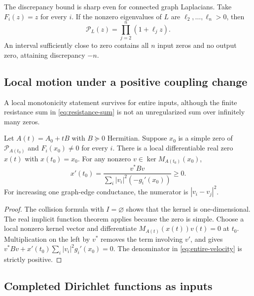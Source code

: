 The discrepancy bound is sharp even for connected graph Laplacians.
Take $F_i(z)=z$ for every $i$.  If the nonzero eigenvalues of $L$ are
$\ell_2,\ldots,\ell_n>0$, then
\[
 \mathcal P_L(z)=\prod_{j=2}^n(1+\ell_jz).
\]
An interval sufficiently close to zero contains all $n$ input zeros
and no output zero, attaining discrepancy $-n$.

\subsection{Local motion under a positive coupling change}

A local monotonicity statement survives for entire inputs, although
the finite resistance sum in \eqref{eq:resistance-sum} is not an
unregularized sum over infinitely many zeros.

\begin{corollary}\label{cor:entire-velocity}
Let $A(t)=A_0+tB$ with $B\succeq0$ Hermitian.
Suppose $x_0$ is a simple zero of $\mathcal P_{A(t_0)}$ and
$F_i(x_0)\neq0$ for every $i$.
There is a local differentiable real zero $x(t)$ with $x(t_0)=x_0$.
For any nonzero $v\in\ker M_{A(t_0)}(x_0)$,
\begin{equation}\label{eq:entire-velocity}
 x'(t_0)=
 \frac{v^*Bv}{\displaystyle\sum_i|v_i|^2(-g_i'(x_0))}\geq0.
\end{equation}
For increasing one graph-edge conductance, the numerator is
$|v_i-v_j|^2$.
\end{corollary}
\begin{proof}
The collision formula with $I=\varnothing$ shows that the kernel is
one-dimensional.  The real implicit function theorem applies because
the zero is simple.  Choose a local nonzero kernel vector and
differentiate $M_{A(t)}(x(t))v(t)=0$ at $t_0$.
Multiplication on the left by $v^*$ removes the term involving $v'$,
and gives
$v^*Bv+x'(t_0)\sum_i|v_i|^2g_i'(x_0)=0$.
The denominator in \eqref{eq:entire-velocity} is strictly positive.
\end{proof}

\subsection{Completed Dirichlet functions as inputs}

